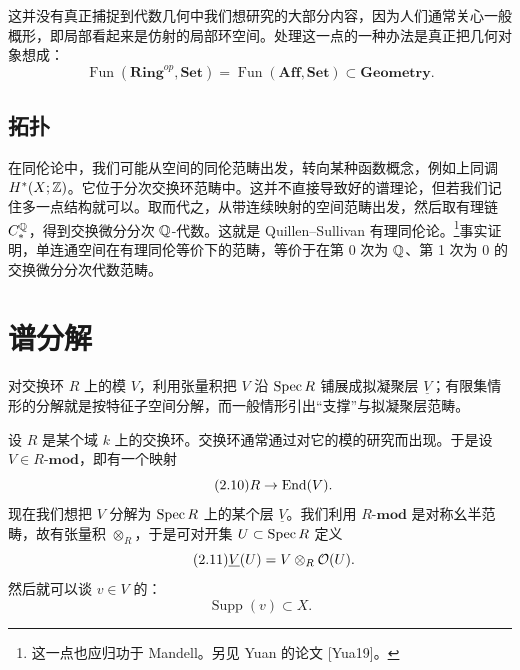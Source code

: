 这并没有真正捕捉到代数几何中我们想研究的大部分内容，因为人们通常关心一般概形，即局部看起来是仿射的局部环空间。处理这一点的一种办法是真正把几何对象想成：
\begin{equation}\tag{2.9}
\operatorname{Fun}(\mathbf{Ring}^{op},\mathbf{Set})
=\operatorname{Fun}(\mathbf{Aff},\mathbf{Set})
\subset \mathbf{Geometry}.
\end{equation}

\subsection{拓扑}

在同伦论中，我们可能从空间的同伦范畴出发，转向某种函数概念，例如上同调 $H^{*}(X;\mathbb{Z})$。它位于分次交换环范畴中。这并不直接导致好的谱理论，但若我们记住多一点结构就可以。取而代之，从带连续映射的空间范畴出发，然后取有理链 $C_*^{\mathbb{Q}}$，得到交换微分分次 $\mathbb{Q}$-代数。这就是 Quillen--Sullivan 有理同伦论。\footnote{这一点也应归功于 Mandell。另见 Yuan 的论文 [Yua19]。}事实证明，单连通空间在有理同伦等价下的范畴，等价于在第 0 次为 $\mathbb{Q}$、第 1 次为 $0$ 的交换微分分次代数范畴。

\section{谱分解}

\begin{sectionkey}
对交换环 $R$ 上的模 $V$，利用张量积把 $V$ 沿 $\mathrm{Spec}\,R$ 铺展成拟凝聚层 $\underline{V}$；有限集情形的分解就是按特征子空间分解，而一般情形引出“支撑”与拟凝聚层范畴。
\end{sectionkey}

设 $R$ 是某个域 $k$ 上的交换环。交换环通常通过对它的模的研究而出现。于是设 $V\in R\text{-}\mathbf{mod}$，即有一个映射
\begin{equation}\tag{2.10}
R\to \mathrm{End}(V).
\end{equation}
现在我们想把 $V$ 分解为 $\mathrm{Spec}\,R$ 上的某个层 $\underline{V}$。我们利用 $R\text{-}\mathbf{mod}$ 是对称幺半范畴，故有张量积 $\otimes_R$，于是可对开集 $U\subset\mathrm{Spec}\,R$ 定义
\begin{equation}\tag{2.11}
\underline{V}(U)=V\otimes_R \mathcal{O}(U).
\end{equation}
然后就可以谈 $v\in V$ 的：
\begin{equation}\tag{2.12}
\operatorname{Supp}(v)\subset X.
\end{equation}


